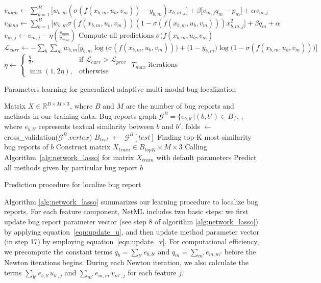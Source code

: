 \begin{algorithm*}[!t]
\begin{algorithmic}[1]
		\State $v_{num} \leftarrow \sum_{b=1}^{B} \big[ w_{b,m} (\sigma(f(x_{b,m}, u_b, v_m)) - y_{b,m}) x_{b,m,j} \big] + \beta \big[ v_{m,j} q_m - p_{m} \big] + \alpha v_{m,j}$
		\State $v_{deno} \leftarrow \sum_{b=1}^{B} \big[ w_{b,m} \sigma(f(x_{b,m}, u_b, v_m)) (1 - \sigma(f(x_{b,m}, u_b, v_m))) x_{b,m,j}^2 \big] + \beta q_m + \alpha$
		\State $v_{m,j} \leftarrow v_{m,j} - \eta \left( \frac{v_{num}}{v_{deno}} \right)$
		\EndFor
		\EndFor
		\State Compute all predictions $\sigma(f(x_{b,m}, u_b, v_m)$
		\State $\mathcal{L}_{curr} \leftarrow -\sum_{b} \sum_{m} w_{b,m} \big[ y_{b,m} \log \big( \sigma(f(x_{b,m}, u_b, v_m)) \big) + \big( 1 - y_{b,m} \big) \log \big(1 - \sigma(f(x_{b,m}, u_b, v_m)) \big) \big]$
		\State $\eta \leftarrow
		\begin{cases}
		\frac{\eta}{2},   & \text{if } \mathcal{L}_{curr} > \mathcal{L}_{prev}\\
		\min(1, 2 \eta),  & \text{otherwise}
		\end{cases}$
		\Until $T_{max}$ iterations
	\end{algorithmic}
	\caption{Parameters learning for generalized adaptive multi-modal bug localization}
	\label{alg:network_lasso}
\end{algorithm*}

\begin{algorithm}
	\begin{algorithmic}[1]
		\Require Matrix $X \in \mathbb{R}^{B \times M \times 3}$, where $B$ and $M$ are the number of bug reports and methods in our training data. Bug reports graph $\mathcal{G}^B=\{e_{b,b'}|(b, b') \in B\}$, , where $e_{b,b'}$ represents textual similarity between $b$ and $b'$.
		\State folds $\leftarrow$ cross\_validation($\mathcal{G}^B.vertex$)
		\State $B_{test}$ $\leftarrow$ $\mathcal{G}^B[test]$
		\State Finding top-K most similarity bug reports of $b$
		\State Construct matrix $X_{train} \in {B_{topK} \times M \times 3}$
		\State Calling Algorithm~\ref{alg:network_lasso} for matrix $X_{train}$ with default parameters
		\State Predict all methods given by particular bug report $b$ 
		\EndFor 
		\EndFor
	\end{algorithmic}
	\caption{Prediction procedure for localize bug report}
	\label{alg:prediction}
\end{algorithm}

Algorithm \ref{alg:network_lasso} summarizes our learning procedure to localize bug reports. For each feature component, NetML includes two basic steps: we first update bug report parameter vector (see step 8 of algorithm \ref{alg:network_lasso}) by applying equation~\ref{eqn:update_u}, and then update method parameter vector (in step 17) by employing equation~\ref{eqn:update_v}. For computational efficiency, we precompute the constant terms $q_b = \sum_{b'} e_{b,b'}$ and $q_m = \sum_{m'} e_{m,m'}$ before the Newton iterations begins. During each Newton iteration, we also calculate the terms $\sum_{b'} e_{b,b'} u_{b',j}$ and $\sum_{m'} e_{m,m'} v_{m',j}$ for each feature $j$.

